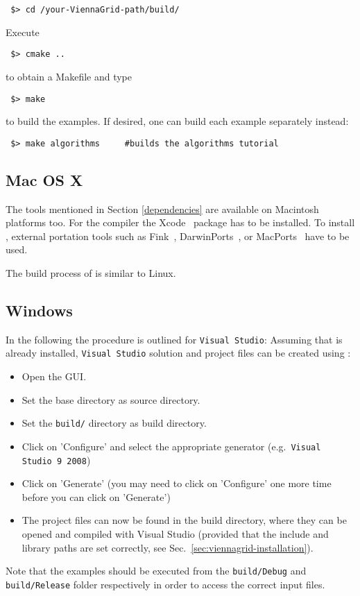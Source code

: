 \begin{lstlisting}
 $> cd /your-ViennaGrid-path/build/
\end{lstlisting}
Execute
\begin{lstlisting}
 $> cmake ..
\end{lstlisting}
to obtain a Makefile and type
\begin{lstlisting}
 $> make 
\end{lstlisting}
to build the examples. If desired, one can build each example separately instead:
\begin{lstlisting}
 $> make algorithms     #builds the algorithms tutorial
\end{lstlisting}


\subsection{Mac OS X}
\label{apple}
The tools mentioned in Section \ref{dependencies} are available on 
Macintosh platforms too. 
For the {\GCC} compiler the Xcode~\cite{xcode} package has to be installed.
To install {\CMake}, external portation tools such as
Fink~\cite{fink}, DarwinPorts~\cite{darwinports}, 
or MacPorts~\cite{macports} have to be used. 

The build process of {\ViennaGrid} is similar to Linux.

\subsection{Windows}
In the following the procedure is outlined for \texttt{Visual Studio}: Assuming
that {\CMake} is already installed, \texttt{Visual Studio} solution
and project files can be created using {\CMake}:
\begin{itemize}
\item Open the {\CMake} GUI.
\item Set the {\ViennaGrid} base directory as source directory.
\item Set the \texttt{build/} directory as build directory.
\item Click on 'Configure' and select the appropriate generator
(e.g.~\texttt{Visual Studio 9 2008})
\item Click on 'Generate' (you may need to click on 'Configure' one more time
before you can click on 'Generate')
\item The project files can now be found in the {\ViennaGrid} build directory,
where they can be opened and compiled with Visual Studio (provided that the
include and library paths are set correctly, see
Sec.~\ref{sec:viennagrid-installation}).
\end{itemize}

Note that the examples should be executed from the \texttt{build/Debug} and \texttt{build/Release} folder respectively in order to access the correct input files.























